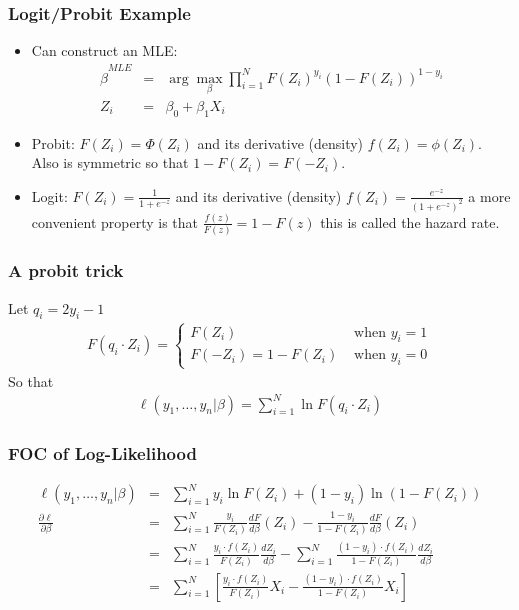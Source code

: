 \documentclass[aspectratio=169]{beamer}
\begin{document}
\begin{frame}
\frametitle{Logit/Probit Example}
\begin{itemize}
\item Can construct an MLE:
\begin{eqnarray*}
\hat{\beta}^{MLE} &=& \arg \max_{\beta} \prod_{i=1}^N F(Z_i)^{y_i} (1-F(Z_i))^{1-{y_i} }\\
Z_i &=& \beta_0 + \beta_1 X_i
\end{eqnarray*}
\item Probit: $F(Z_i) = \Phi(Z_i)$ and its derivative (density) $f(Z_i) = \phi(Z_i)$. \\
Also is \alert{symmetric} so that $1 - F(Z_i) = F(-Z_i)$.
\item Logit: $F(Z_i) = \frac{1}{1+e^{-z}}$ and its derivative (density) $f(Z_i) = \frac{e^{-z}}{(1+e^{-z})^2}$ a more convenient property is that $\frac{f(z)}{F(z)} = 1 - F(z)$ this is called the \alert{hazard rate}.
\end{itemize}
\end{frame}

\begin{frame}
\frametitle{A probit trick}
Let $q_i = 2 y_i -1$
\begin{eqnarray*}
F(q_i \cdot Z_i) = 
\begin{cases}
F(Z_i)  &\mbox{ when } y_i=1 \\
F(-Z_i) = 1-F(Z_i)& \mbox{ when } y_i=0
\end{cases}
\end{eqnarray*}
So that 
\begin{eqnarray*}
\ell(y_1,\ldots, y_n | \beta) = \sum_{i=1}^N \ln F(q_i \cdot Z_i) 
\end{eqnarray*}
\end{frame}


\begin{frame}
\frametitle{FOC of Log-Likelihood}
\begin{eqnarray*}
\ell(y_1,\ldots,y_n | \beta) &=& \sum_{i=1}^N y_i \ln F(Z_i) + (1-y_i) \ln(1- F(Z_i)) \\
\frac{\partial \ell }{\partial \beta} &=& \sum_{i=1}^N \frac{y_i}{ F(Z_i)} \frac{ d F}{d \beta}(Z_i) - \frac{1-y_i}{1-F(Z_i)}  \frac{ d F}{d \beta} (Z_i)\\
 &=& \sum_{i=1}^N \frac{y_i \cdot f(Z_i) }{ F(Z_i)} \frac{ d Z_i}{d \beta} -  \sum_{i=1}^N \frac{(1-y_i)\cdot f(Z_i) }{1-F(Z_i)} \frac{ d Z_i}{d \beta} \\
 &=& \sum_{i=1}^N  \left[ \frac{y_i \cdot f(Z_i) }{ F(Z_i)} X_i -  \frac{(1-y_i)\cdot f(Z_i) }{1-F(Z_i)} X_i \right] \\
\end{eqnarray*}
\end{frame}
\end{document}
